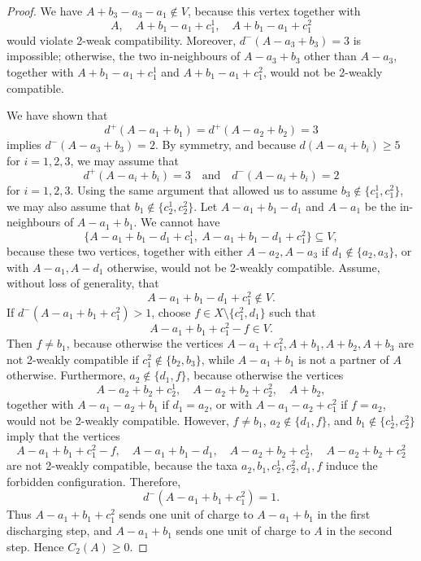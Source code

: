 \documentclass[10pt,a4paper]{amsart}
\begin{document}
\begin{proof}
		We have $A+b_3-a_3-a_1\notin V$, because this vertex together with
		\[
		A,\quad A+b_1-a_1+c_1^1,\quad A+b_1-a_1+c_1^2
		\]
		would violate 2-weak compatibility. Moreover, $d^-(A-a_3+b_3)=3$ is impossible; otherwise, the two in-neighbours of $A-a_3+b_3$ other than $A-a_3$, together with $A+b_1-a_1+c_1^1$ and $A+b_1-a_1+c_1^2$, would not be 2-weakly compatible.
		
		We have shown that
		\[
		d^+(A-a_1+b_1)=d^+(A-a_2+b_2)=3
		\]
		implies $d^-(A-a_3+b_3)=2$. By symmetry, and because $d(A-a_i+b_i)\ge 5$ for $i=1,2,3$, we may assume that
		\[
		d^+(A-a_i+b_i)=3\quad\text{and}\quad d^-(A-a_i+b_i)=2
		\]
		for $i=1,2,3$. Using the same argument that allowed us to assume $b_3\notin\{c_1^1,c_1^2\}$, we may also assume that $b_1\notin\{c_2^1,c_2^2\}$. Let $A-a_1+b_1-d_1$ and $A-a_1$ be the in-neighbours of $A-a_1+b_1$. We cannot have
		\[
		\{A-a_1+b_1-d_1+c_1^1,\ A-a_1+b_1-d_1+c_1^2\}\subseteq V,
		\]
		because these two vertices, together with either $A-a_2,A-a_3$ if $d_1\notin\{a_2,a_3\}$, or with $A-a_1,A-d_1$ otherwise, would not be 2-weakly compatible. Assume, without loss of generality, that
		\[
		A-a_1+b_1-d_1+c_1^2\notin V.
		\]
		If $d^-(A-a_1+b_1+c_1^2)>1$, choose $f\in X\setminus\{c_1^2,d_1\}$ such that
		\[
		A-a_1+b_1+c_1^2-f\in V.
		\]
		Then $f\ne b_1$, because otherwise the vertices $A-a_1+c_1^2,A+b_1,A+b_2,A+b_3$ are not 2-weakly compatible if $c_1^2\notin\{b_2,b_3\}$, while $A-a_1+b_1$ is not a partner of $A$ otherwise. Furthermore, $a_2\notin\{d_1,f\}$, because otherwise the vertices
		\[
		A-a_2+b_2+c_2^1,\quad A-a_2+b_2+c_2^2,\quad A+b_2,
		\]
		together with $A-a_1-a_2+b_1$ if $d_1=a_2$, or with $A-a_1-a_2+c_1^2$ if $f=a_2$, would not be 2-weakly compatible. However, $f\ne b_1$, $a_2\notin\{d_1,f\}$, and $b_1\notin\{c_2^1,c_2^2\}$ imply that the vertices
		\[
		A-a_1+b_1+c_1^2-f,\quad A-a_1+b_1-d_1,\quad A-a_2+b_2+c_2^1,\quad A-a_2+b_2+c_2^2
		\]
		are not 2-weakly compatible, because the taxa $a_2,b_1,c_2^1,c_2^2,d_1,f$ induce the forbidden configuration. Therefore,
		\[
		d^-(A-a_1+b_1+c_1^2)=1.
		\]
		Thus $A-a_1+b_1+c_1^2$ sends one unit of charge to $A-a_1+b_1$ in the first discharging step, and $A-a_1+b_1$ sends one unit of charge to $A$ in the second step. Hence $C_2(A)\ge 0$.
	\end{proof}
\end{document}
